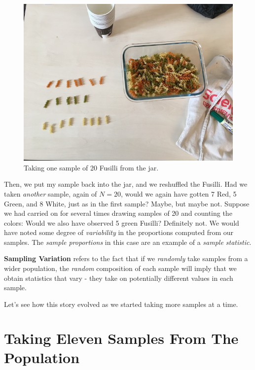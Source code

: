 \documentclass[]{book}
\newenvironment{note}{\begin{tcolorbox}[colback=blue!5!white,colframe=blue!75!black]}{\end{tcolorbox}}
\begin{document}
\begin{figure}

{\centering \includegraphics[width=0.9\linewidth]{images/pasta5} 

}

\caption{Taking one sample of 20 Fusilli from the jar.}\label{fig:pasta5}
\end{figure}

Then, we put my sample back into the jar, and we reshuffled the Fusilli. Had we taken \emph{another} sample, again of \(N=20\), would we again have gotten 7 Red, 5 Green, and 8 White, just as in the first sample? Maybe, but maybe not. Suppose we had carried on for several times drawing samples of 20 and counting the colors: Would we also have observed 5 green Fusilli? Definitely not. We would have noted some degree of \emph{variability} in the proportions computed from our samples. The \emph{sample proportions} in this case are an example of a \emph{sample statistic}.

\begin{note}
\textbf{Sampling Variation} refers to the fact that if we
\emph{randomly} take samples from a wider population, the \emph{random}
composition of each sample will imply that we obtain statistics that
vary - they take on potentially different values in each sample.
\end{note}

Let's see how this story evolved as we started taking more samples at a time.

\hypertarget{taking-eleven-samples-from-the-population}{%
\section{Taking Eleven Samples From The Population}\label{taking-eleven-samples-from-the-population}}
\end{document}
